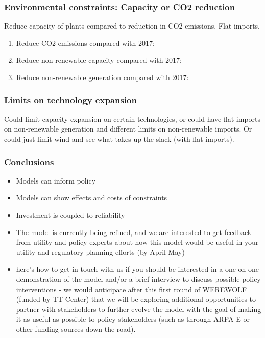 \documentclass[xcolor=dvipsnames]{beamer}
\begin{document}
\begin{frame}
  \frametitle{Environmental constraints: Capacity or CO2 reduction}

Reduce capacity of plants compared to reduction in CO2 emissions. Flat imports.
\begin{enumerate}
\item Reduce \alert{CO2 emissions} compared with 2017:
\item Reduce \alert{non-renewable capacity} compared with 2017:
\item Reduce \alert{non-renewable generation} compared with 2017:
\end{enumerate}

\end{frame}

\begin{frame}
  \frametitle{Limits on technology expansion}

Could limit capacity expansion on certain technologies, or could have flat imports on non-renewable generation and different limits on non-renewable imports.   Or could just limit wind and see what takes up the slack (with flat imports).
\end{frame}

\begin{frame}
  \frametitle{Conclusions}
  \begin{itemize}
  \item Models can inform policy
  \item Models can show effects and costs of constraints
  \item Investment is coupled to reliability
      \item The model is currently being refined, and we are interested to get feedback from utility and policy experts about how this model would be useful in your utility and regulatory planning efforts (by April-May) 
  \item  here's how to get in touch with us if you should be interested in a one-on-one demonstration of the model and/or a brief interview to discuss possible policy interventions - we would anticipate after this first round of WEREWOLF (funded by TT Center) that we will be exploring additional opportunities to partner with stakeholders to further evolve the model with the goal of making it as useful as possible to policy stakeholders (such as through ARPA-E or other funding sources down the road).
  \end{itemize}
\end{frame}
\end{document}
